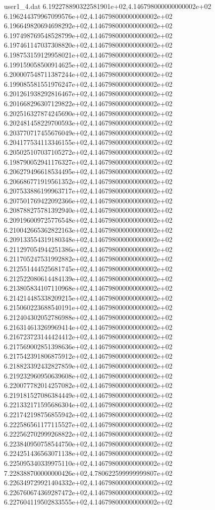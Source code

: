 \begin{filecontents}{user1_4.dat}
6.192278890322581901e+02,4.146798000000000002e+02
6.196244379967099576e+02,4.146798000000000002e+02
6.196649820694698292e+02,4.146798000000000002e+02
6.197498769548528799e+02,4.146798000000000002e+02
6.197461147037308820e+02,4.146798000000000002e+02
6.198753159129958021e+02,4.146798000000000002e+02
6.199159058500914625e+02,4.146798000000000002e+02
6.200007548711387244e+02,4.146798000000000002e+02
6.199085581551976247e+02,4.146798000000000002e+02
6.201261938292816467e+02,4.146798000000000002e+02
6.201668296307129822e+02,4.146798000000000002e+02
6.202516327874245690e+02,4.146798000000000002e+02
6.202481458229700593e+02,4.146798000000000002e+02
6.203770717455676049e+02,4.146798000000000002e+02
6.204177534113346155e+02,4.146798000000000002e+02
6.205025107037105272e+02,4.146798000000000002e+02
6.198790052941176327e+02,4.146798000000000002e+02
6.206279496618534495e+02,4.146798000000000002e+02
6.206686771919561352e+02,4.146798000000000002e+02
6.207533886199963717e+02,4.146798000000000002e+02
6.207501769422092366e+02,4.146798000000000002e+02
6.208788275781392940e+02,4.146798000000000002e+02
6.209196009725776548e+02,4.146798000000000002e+02
6.210042665362822163e+02,4.146798000000000002e+02
6.209133554319180348e+02,4.146798000000000002e+02
6.211297054944251386e+02,4.146798000000000002e+02
6.211705247531992882e+02,4.146798000000000002e+02
6.212551444525681745e+02,4.146798000000000002e+02
6.212522080614484139e+02,4.146798000000000002e+02
6.213805834107110968e+02,4.146798000000000002e+02
6.214214485338209215e+02,4.146798000000000002e+02
6.215060223688540191e+02,4.146798000000000002e+02
6.212404302052786988e+02,4.146798000000000002e+02
6.216314613269969414e+02,4.146798000000000002e+02
6.216723723144424412e+02,4.146798000000000002e+02
6.217569002851398636e+02,4.146798000000000002e+02
6.217542391806875912e+02,4.146798000000000002e+02
6.218823392432827859e+02,4.146798000000000002e+02
6.219232960950639608e+02,4.146798000000000002e+02
6.220077782014257082e+02,4.146798000000000002e+02
6.219181527086384449e+02,4.146798000000000002e+02
6.221332171595686304e+02,4.146798000000000002e+02
6.221742198756855942e+02,4.146798000000000002e+02
6.222586561177115527e+02,4.146798000000000002e+02
6.222562702999268822e+02,4.146798000000000002e+02
6.223840950758544750e+02,4.146798000000000002e+02
6.224251436563071138e+02,4.146798000000000002e+02
6.225095340339975110e+02,4.146798000000000002e+02
7.228388700000000426e+02,4.780622599999999807e+02
6.226349729921404332e+02,4.146798000000000002e+02
6.226760674369287472e+02,4.146798000000000002e+02
6.227604119502833555e+02,4.146798000000000002e+02

\end{filecontents}
